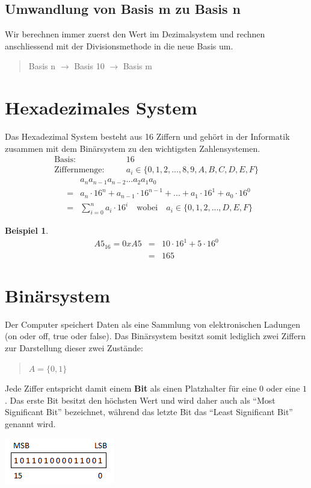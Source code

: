 \documentclass[a4paper,10pt]{report}
\newtheorem{myexample}{Beispiel}
\begin{document}
\subsection{Umwandlung von Basis m zu Basis n}
Wir berechnen immer zuerst den Wert im Dezimalsystem und rechnen anschliessend mit der Divisionsmethode in die neue Basis um.
\begin{quote}Basis n $\to$ Basis 10 $\to$ Basis m\end{quote}

\section{Hexadezimales System}
Das Hexadezimal System besteht aus 16 Ziffern und gehört in der Informatik zusammen mit dem Binärsystem zu den wichtigsten Zahlensystemen.
\begin{eqnarray}\mbox{Basis}:&\quad& 16 \nonumber \\
\mbox{Ziffernmenge}:&\quad&a_i \in \{0, 1, 2, ..., 8, 9, A, B, C, D, E, F\}\end{eqnarray}
\begin{eqnarray}&&a_n a_{n-1} a_{n-2} ... a_2 a_1 a_0 \nonumber \\
&=&a_n \cdot 16^n + a_{n-1} \cdot 16^{n-1} + ... + a_1 \cdot 16^1 + a_0 \cdot 16^0 \nonumber \\
&=&\sum_{i=0}^{n} a_i \cdot 16^i \quad \mbox{wobei}\quad a_i \in \{0, 1, 2, ..., D, E, F\}\end{eqnarray}
\begin{myexample}
\begin{eqnarray}A5_{16} = 0xA5&=&10 \cdot 16^1 + 5 \cdot 16^0 \nonumber \\
&=&165\end{eqnarray}\end{myexample}
\section{Binärsystem}
Der Computer speichert Daten als eine Sammlung von elektronischen Ladungen (on oder off, true oder false). Das Binärsystem besitzt somit lediglich zwei Ziffern zur Darstellung dieser zwei Zustände:
\begin{quote}$A=\{0,1\}$\end{quote}
Jede Ziffer entspricht damit einem \textbf{Bit} als einen Platzhalter für eine $0$ oder eine $1$. Das erste Bit besitzt den höchsten Wert und wird daher auch als "`Most Significant Bit"' bezeichnet, während das letzte Bit das "`Least Significant Bit"' genannt wird. \\
\begin{center}\includegraphics[scale=0.85]{imgs/MSB.png}\end{center}
\end{document}
